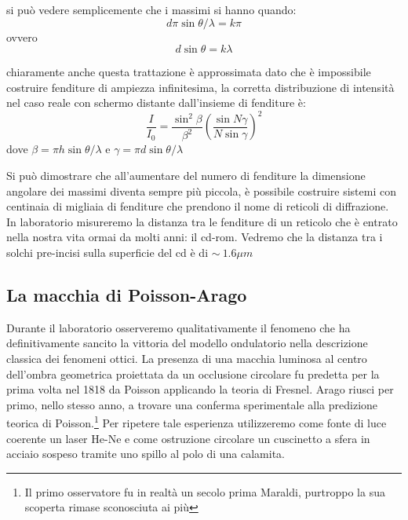 \documentclass[a4paper,10pt,oneside]{article}
\begin{document}
si può vedere semplicemente che i massimi si hanno quando:
\begin{equation}
 d\pi\sin\theta/\lambda=k\pi
\end{equation}
ovvero
\begin{equation}
 d\sin\theta=k\lambda
\end{equation}

chiaramente anche questa trattazione è approssimata dato che è impossibile costruire fenditure di ampiezza infinitesima, la corretta distribuzione di intensità nel caso reale con schermo distante dall'insieme di fenditure è:
\begin{equation}
 \frac{I}{I_0}=\frac{\sin^2 \beta}{\beta^2}\left(\frac{\sin N\gamma}{N\sin \gamma}\right)^2
\end{equation}
dove $\beta=\pi h\sin\theta/\lambda$ e $\gamma=\pi d\sin\theta/\lambda$

Si può dimostrare che all'aumentare del numero di fenditure la dimensione angolare dei massimi diventa sempre più piccola, è possibile costruire sistemi con centinaia di migliaia di fenditure che prendono il nome di reticoli di diffrazione. In laboratorio misureremo la distanza tra le fenditure di un reticolo che è entrato nella nostra vita ormai da molti anni: il cd-rom. Vedremo che la distanza tra i solchi pre-incisi sulla superficie del cd è di $\sim\ 1.6\mu m$ 

\subsection{La macchia di Poisson-Arago}
Durante il laboratorio osserveremo qualitativamente il fenomeno che ha definitivamente sancito la vittoria del modello ondulatorio nella descrizione classica dei fenomeni ottici. La presenza di una macchia luminosa al centro dell'ombra geometrica proiettata da un occlusione circolare fu predetta per la prima volta nel 1818 da Poisson applicando la teoria di Fresnel. Arago riusci per primo, nello stesso anno, a trovare una conferma sperimentale alla predizione teorica di Poisson.\footnote{Il primo osservatore fu in realtà un secolo prima Maraldi, purtroppo la sua scoperta rimase sconosciuta ai più} 
Per ripetere tale esperienza utilizzeremo come fonte di luce coerente un laser He-Ne e come ostruzione circolare un cuscinetto a sfera in acciaio sospeso tramite uno spillo al polo di una calamita.
\end{document}

